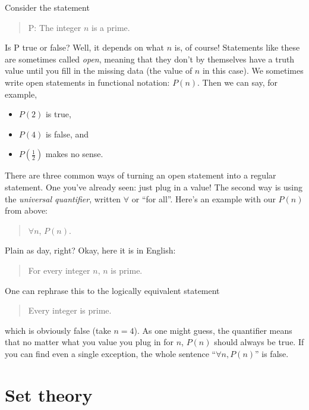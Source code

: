 \documentclass{tufte-book}
\begin{document}
Consider the statement
\begin{quote}
  P: The integer $n$ is a prime.
\end{quote}
Is P true or false? Well, it depends on what $n$ is, of course! Statements like these are sometimes called \emph{open}, meaning that they don't by themselves have a truth value until you fill in the missing data (the value of $n$ in this case). We sometimes write open statements in functional notation: $P(n)$. Then we can say, for example,
\begin{itemize}
    \item $P(2)$ is true,
    \item $P(4)$ is false, and
    \item $P(\frac12)$ makes no sense.
\end{itemize}

  There are three common ways of turning an open statement into a regular statement. One you've already seen: just plug in a value! The second way is using the \emph{universal quantifier}, written $\forall$ or ``for all''. Here's an example with our $P(n)$ from above:
  \begin{quote}
    $\forall n$, $P(n)$.
  \end{quote}
  Plain as day, right? Okay, here it is in English:
  \begin{quote}
    For every integer $n$, $n$ is prime.
  \end{quote}
  One can rephrase this to the logically equivalent statement
  \begin{quote}
    Every integer is prime.
  \end{quote}
  which is obviously false (take $n = 4$). As one might guess, the quantifier means that no matter what you value you plug in for $n$, $P(n)$ should always be true. If you can find even a single exception, the whole sentence ``$\forall n, P(n)$'' is false.



\chapter{Set theory}
\label{cha:set-theory}
\end{document}
